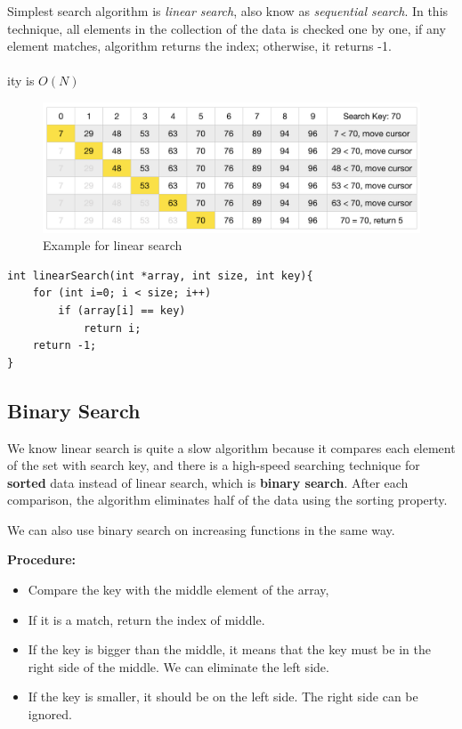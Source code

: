 \documentclass[12pt]{article}
\begin{document}
Simplest search algorithm is \textit{linear search}, also know as \textit{sequential search}. In this technique, all elements in the collection of the data is checked one by one, if any element matches, algorithm returns the index; otherwise, it returns -1. \\ \\
ity is $O(N)$

\begin{figure}[h]
	\centering
	\includegraphics[width=0.9\linewidth]{linear_search}
	\caption{Example for linear search}
	\label{fig:linear_search}
\end{figure}


\begin{verbatim}
int linearSearch(int *array, int size, int key){
    for (int i=0; i < size; i++)
        if (array[i] == key)
            return i;
    return -1;
}
\end{verbatim}

\cleardoublepage
	
		\subsection{Binary Search}
			
We know linear search is quite a slow algorithm because it compares each element of the set with search key, and there is a high-speed searching technique for \textbf{sorted} data instead of linear search, which is \textbf{binary search}. After each comparison, the algorithm eliminates half of the data using the sorting property. 

We can also use binary search on increasing functions in the same way. 

\textbf{Procedure: }
\begin{itemize}
	\item Compare the key with the middle element of the array,
	\item If it is a match, return the index of middle.
	\item If the key is bigger than the middle, it means that the key must be in the right side of the middle. We can eliminate the left side.
	\item If the key is smaller, it should be on the left side. The right side can be ignored.
\end{itemize}	
\end{document}
